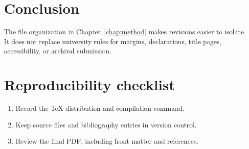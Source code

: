 \chapter{Conclusion}
The file organization in Chapter~\ref{chap:method} makes revisions
easier to isolate. It does not replace university rules for margins,
declarations, title pages, accessibility, or archival submission.

\appendix
\chapter{Reproducibility checklist}
\begin{enumerate}
  \item Record the TeX distribution and compilation command.
  \item Keep source files and bibliography entries in version control.
  \item Review the final PDF, including front matter and references.
\end{enumerate}
